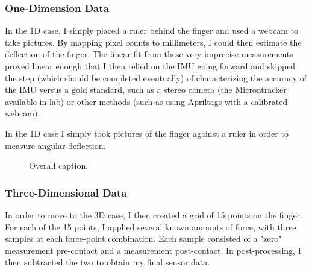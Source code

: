 \documentclass[preprint,12pt,3p]{elsarticle}
\begin{document}
\subsubsection{One-Dimension Data}
In the 1D case, I simply placed a ruler behind the finger and used a webcam to take
pictures. By mapping pixel counts to millimeters, I could then estimate the deflection of the
finger. The linear fit from these very imprecise measurements proved linear enough that I then
relied on the IMU going forward and skipped the step (which should be completed eventually) of
characterizing the accuracy of the IMU versus a gold standard, such as a stereo camera (the
Microntracker available in lab) or other methods (such as using Apriltags with a calibrated webcam). 

In the 1D case I simply took pictures of the finger against a ruler in order to measure angular deflection. 

\begin{figure}[htbp]
    \centering 
        \hfil %
        \hfil
        \caption{ Overall caption.}
    \label{fig:myfig}
\end{figure}

\subsubsection{Three-Dimensional Data}
In order to move to the 3D case, I then created a grid of 15 points on the finger. For each of the
15 points, I applied several known amounts of force, with three samples at each force-point
combination. Each sample consisted of a "zero" measurement pre-contact and a
measurement post-contact. In post-processing, I then subtracted the two to
obtain my final sensor data.
\end{document}

